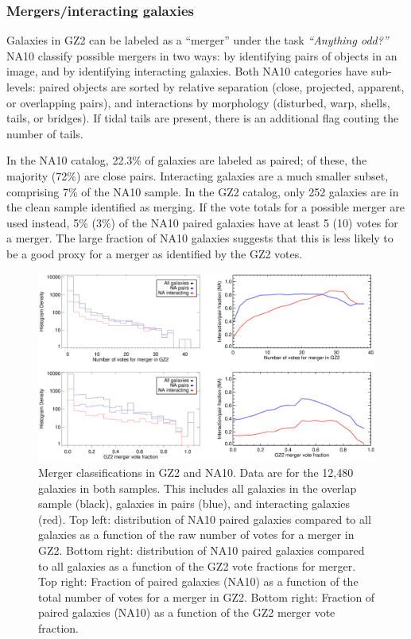 \documentclass[useAMS,usenatbib]{mn2e}
\begin{document}
\subsubsection{Mergers/interacting galaxies}

Galaxies in GZ2 can be labeled as a ``merger'' under the task {\it ``Anything odd?''} NA10 classify possible mergers in two ways: by identifying pairs of objects in an image, and by identifying interacting galaxies. Both NA10 categories have sub-levels: paired objects are sorted by relative separation (close, projected, apparent, or overlapping pairs), and interactions by morphology (disturbed, warp, shells, tails, or bridges). If tidal tails are present, there is an additional flag couting the number of tails. 

In the NA10 catalog, 22.3\% of galaxies are labeled as paired; of these, the majority (72\%) are close pairs. Interacting galaxies are a much smaller subset, comprising 7\% of the NA10 sample. In the GZ2 catalog, only 252 galaxies are in the clean sample identified as merging. If the vote totals for a possible merger are used instead, 5\% (3\%) of the NA10 paired galaxies have at least 5 (10) votes for a merger. The large fraction of NA10 galaxies suggests that this is less likely to be a good proxy for a merger as identified by the GZ2 votes. 

\begin{figure}
\includegraphics[angle=0,width=7.0in]{figures/na_pairs.eps}
\caption{Merger classifications in GZ2 and NA10. Data are for the 12,480 galaxies in both samples. This includes all galaxies in the overlap sample (black), galaxies in pairs (blue), and interacting galaxies (red). Top left: distribution of NA10 paired galaxies compared to all galaxies as a function of the raw number of votes for a merger in GZ2. Bottom right: distribution of NA10 paired galaxies compared to all galaxies as a function of the GZ2 vote fractions for merger. Top right: Fraction of paired galaxies (NA10) as a function of the total number of votes for a merger in GZ2. Bottom right: Fraction of paired galaxies (NA10) as a function of the GZ2 merger vote fraction. 
\label{fig-na_pairs}}
\end{figure}
\end{document}
